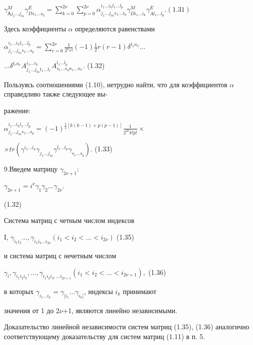 \documentclass{article}
\begin{document}
{$\gamma^{M}_{Аj_1 \dots j_m}\gamma^{E}_{Ds_1 \dots s_q}=\sum_{k=0}^{2\nu}\sum_{p=0}^{2\nu}\alpha_{j_1 \dots j_m s_1 \dots s_q}^{i_1 \dots i_k l_1 \dots l_p}\gamma^{M}_{D i_1 \dots i_k}\gamma^{E}_{A l_1 \dots l_p}. (1.31)$ \par
Здесь коэффициенты $\alpha$ определяются равенствами \par
$\alpha_{j_1 \dots j_m s_1 \dots s_q}^{i_1 \dots i_k l_1 \dots l_p}=\sum_{r=0}^{2\nu}\frac{1}{{2^\nu}r!}(-1)\frac{1}{2}r(r-1)\delta^{t_1 n_1}\dots $\par
\begin{center}
$\dots \delta^{t_r n_r}A_{j_1 \dots j_m t_1\dots t_r}^{i_1 \dots i_k}A_{s_1 \dots s_q n_1 \dots n_r}^{l_1 \dots l_p}.$ (1.32)\par
\end{center}
Пользуясь соотношениями (1.10), нетрудно найти, что для коэффициентов $\alpha$ справедливо также следующее вы-\par
ражение: \par
$\alpha_{j_1 \dots j_m s_1 \dots s_q}^{i_1 \dots i_k l_1 \dots l_p}=(-1)^{\frac{1}{2}[k(k-1)+p(p-1)]}\frac{1}{2^{2\nu}k!p!}\times$\par
\begin{center}
$\times tr(\gamma^{i_1 \dots i_k}\gamma_{j_1 \dots j_m}\gamma^{l_1 \dots l_p}\gamma_{s_1 \dots s_q}).$ (1.33)\par
\end{center}
9.Введем матрицу $\gamma_{2\nu+1}$:
\begin{center}
$\gamma_{2\nu+1}=i^{\nu}\gamma_{1}\gamma_{2}\dots\gamma_{2\nu}.$\par (1.32)
\end{center}
Система матриц с четным числом индексов\par
\begin{center}
I, $\gamma_{i_1 i_2} \dots, \gamma_{i_1 i_2 \dots i_{2\nu}} (i_1<i_2< \dots<i_{2\nu})$ (1.35)\par
\end{center}
и система матриц с нечетным числом \par
\begin{center}
$\gamma_i,\gamma_{i_1 i_2 i_3},\dots ,\gamma_{i_1 i_2 i_3,\dots i_{2\nu+1}} (i_1<i_2<\dots<i_{2\nu+1}),$ (1.36)\par
\end{center}
в которых $\gamma_{i_1 \dots i_k}=\gamma_{[i_1} \dots \gamma_{i_k]}$, индексы $i_k$ принимают\par
значения от 1 до $2\nu$+1, являются линейно независимыми.\par
Доказательство линейной независимости систем матриц  (1.35), (1.36) аналогично соответствующему доказательству для систем матриц (1.11) в п. 5.\par

}
\end{document}
